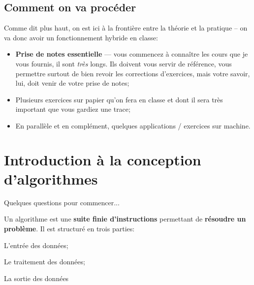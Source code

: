 \documentclass[12pt]{article}
\begin{document}
	\subsection{Comment on va procéder}
	Comme dit plus haut, on est ici à la frontière entre la théorie et la pratique -- on va donc avoir un fonctionnement hybride en classe:
	 \begin{itemize}
	 	\item \textbf{Prise de notes essentielle} --- vous commencez à connaître les cours que je vous fournis, il sont \textit{très} longs. Ils doivent vous servir de référence, vous permettre surtout de bien revoir les corrections d'exercices, mais votre savoir, lui, doit venir de votre prise de notes;
	 	\item Plusieurs exercices sur papier qu'on fera en classe et dont il sera très important que vous gardiez une trace;
	 	\item En parallèle et en complément, quelques applications / exercices sur machine.
	 \end{itemize}
	 
	 \pagebreak
	 
	 \section{Introduction à la conception d'algorithmes}
	 
	 Quelques questions pour commencer...
	 
	 \begin{MaReponse}
	 	Un algorithme est une \textbf{suite finie d'instructions} permettant de \textbf{résoudre un problème}. Il est structuré en trois parties:
		 \begin{alphenum}
		 	\item L'entrée des données;
		 	\item Le traitement des données;
		 	\item La sortie des données 
		 \end{alphenum}
	\end{MaReponse}
	
	
\end{document}
